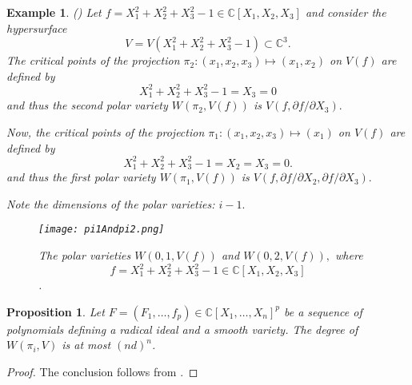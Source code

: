 \documentclass[a4paper]{article}
\def\pa{\partial}
\def\C{\mathbb{C}}
\def\Wi{W(\pi_i,V)}
\newtheorem{ex}[theorem]{Example}
\newtheorem{prop}[theorem]{Proposition}
\begin{document}
\begin{ex} (\cite[Example 3.1]{TWT})
Let $f = X_1^2 + X_2^2 + X_3^2-1\in \C[X_1,X_2,X_3]$ and consider the hypersurface
\[
         V=V(X_1^2 + X_2^2 + X_3^2-1) \subset \mathbb{C}^{3}.
\]
The critical points of the projection $\pi_2: (x_1,x_2,x_3) \mapsto (x_1,x_2)$ on $V(f)$ are defined by 
\[
X_1^2 + X_2^2 + X_3^2-1=X_3=0
\]
and thus the second polar variety $W(\pi_2,V(f))$ is
$V\left(f,\pa f/\pa X_3\right).$ 
\par 
Now, the critical points of the projection $\pi_1: (x_1,x_2,x_3) \mapsto (x_1)$ on $V(f)$ are defined by 
\[
X_1^2 + X_2^2 + X_3^2-1=X_2=X_3=0.
\]
and thus the first polar variety $W(\pi_1,V(f))$ is $V\left(f,\pa f/\pa X_2,\pa f/\pa X_3\right).$ 

Note the dimensions of the polar varieties: $i-1.$
\begin{figure}[h]
\texttt{[image: pi1Andpi2.png]}
\centering
\caption{The polar varieties $W(0, 1, V(f))$ and $W(0, 2, V(f)),$ where \[f = X_1^2 + X_2^2 + X_3^2-1\in \C[X_1,X_2,X_3]\] \cite[Example 3.1]{TWT}.}
\end{figure}
%
\end{ex}
%



















%
%
\begin{prop}\label{prop:degreePolarV}
Let $F=(F_1,\hdots,f_p) \in \C[X_1,\hdots,X_n]^p$ be a sequence of polynomials defining a radical ideal and a smooth variety. The degree of $\Wi$ is at most $(nd)^n$.
\end{prop}
\begin{proof}
The conclusion follows from \cite[Proposition 2.3]{Heintz1980}.
\end{proof}



\end{document}
